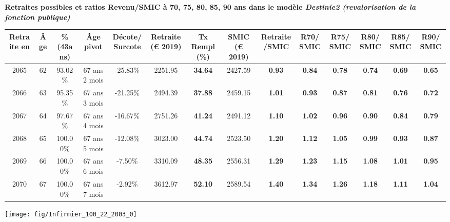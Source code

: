  \vspace{0.1cm} 
{\bf \noindent Retraites possibles et ratios Revenu/SMIC à 70, 75, 80, 85, 90 ans dans le modèle \emph{Destinie2 (revalorisation de la fonction publique)}}  
 
\begin{adjustbox}{max width=\textwidth} 
\begin{tabular}[htb]{|c|c||c|c|c||c|c||c|c||c|c|c|c|c|} 
\hline 
 Retraite en &  Âge &  \%(43ans) &  Âge pivot &  Décote/Surcote &  Retraite (\euro{} 2019) &  Tx Rempl(\%) &  SMIC (\euro{} 2019) &  Retraite/SMIC &  R70/SMIC &  R75/SMIC &  R80/SMIC &  R85/SMIC &  R90/SMIC \\ 
\hline \hline 
 2065 &  62 &  93.02\% &  67 ans 2 mois &  -25.83\% &  2251.95 &  {\bf 34.64} &  2427.59 &  {\bf {\color{red} 0.93}} &  {\bf {\color{red} 0.84}} &  {\bf {\color{red} 0.78}} &  {\bf {\color{red} 0.74}} &  {\bf {\color{red} 0.69}} &  {\bf {\color{red} 0.65}} \\ 
\hline 
 2066 &  63 &  95.35\% &  67 ans 3 mois &  -21.25\% &  2494.39 &  {\bf 37.88} &  2459.15 &  {\bf 1.01} &  {\bf {\color{red} 0.93}} &  {\bf {\color{red} 0.87}} &  {\bf {\color{red} 0.81}} &  {\bf {\color{red} 0.76}} &  {\bf {\color{red} 0.72}} \\ 
\hline 
 2067 &  64 &  97.67\% &  67 ans 4 mois &  -16.67\% &  2751.26 &  {\bf 41.24} &  2491.12 &  {\bf 1.10} &  {\bf 1.02} &  {\bf {\color{red} 0.96}} &  {\bf {\color{red} 0.90}} &  {\bf {\color{red} 0.84}} &  {\bf {\color{red} 0.79}} \\ 
\hline 
 2068 &  65 &  100.00\% &  67 ans 5 mois &  -12.08\% &  3023.00 &  {\bf 44.74} &  2523.50 &  {\bf 1.20} &  {\bf 1.12} &  {\bf 1.05} &  {\bf {\color{red} 0.99}} &  {\bf {\color{red} 0.93}} &  {\bf {\color{red} 0.87}} \\ 
\hline 
 2069 &  66 &  100.00\% &  67 ans 6 mois &  -7.50\% &  3310.09 &  {\bf 48.35} &  2556.31 &  {\bf 1.29} &  {\bf 1.23} &  {\bf 1.15} &  {\bf 1.08} &  {\bf 1.01} &  {\bf {\color{red} 0.95}} \\ 
\hline 
 2070 &  67 &  100.00\% &  67 ans 7 mois &  -2.92\% &  3612.97 &  {\bf 52.10} &  2589.54 &  {\bf 1.40} &  {\bf 1.34} &  {\bf 1.26} &  {\bf 1.18} &  {\bf 1.11} &  {\bf 1.04} \\ 
\hline 
\hline 
\end{tabular} 
\end{adjustbox} 
 
 \vspace{0.1cm} 

 {\hspace{-2.2cm}\texttt{[image: fig/Infirmier\_100\_22\_2003\_0]}} 

